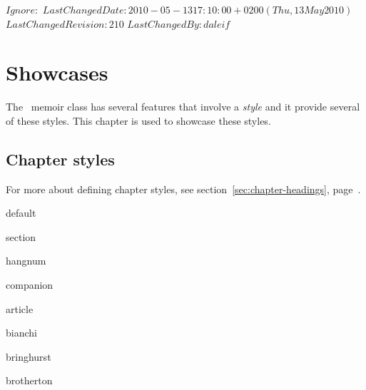 
\svnidlong
{$Ignore: $}
{$LastChangedDate: 2010-05-13 17:10:00 +0200 (Thu, 13 May 2010) $}
{$LastChangedRevision: 210 $}
{$LastChangedBy: daleif $}

\chapter{Showcases}
\label{cha:showcases}

The \theclass\ memoir class has several features that involve a
\emph{style} and it provide several of these styles. This chapter is
used to showcase these styles.

\begingroup


\section{Chapter styles}
\label{sec:chapter-styles}


For more about defining chapter styles, see
section~\ref{sec:chapter-headings}, page~\pageref{sec:chapter-headings}.

\begin{demochap}[-3\onelineskip]{default}\end{demochap}

\begin{demochap}[2\onelineskip]{section}\end{demochap}

\begin{demochap}[2\onelineskip]{hangnum}\end{demochap}

\begin{demochap}[2\onelineskip]{companion}\end{demochap}

\begin{demochap}[-1\onelineskip]{article}\end{demochap}

\begin{demochap}[-2\onelineskip]{bianchi}\end{demochap}

\begin{demochap}{bringhurst}\end{demochap}

\begin{demochap}[-2\onelineskip]{brotherton}\end{demochap}

